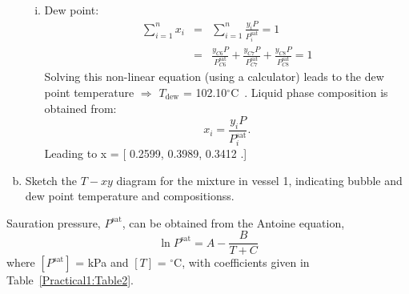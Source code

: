 \documentclass[calculator,allquestions,datasheet,solutions]{exam_newMarcus2}
\newcommand{\frc}{\displaystyle\frac}
\begin{document}
\begin{question}
\begin{enumerate}[a)]
{\begin{enumerate}[i)]
                      \begin{displaymath}
                         y_{i} = \frc{x_{i}P_{i}^{\text{sat}}}{P}.
                      \end{displaymath}
                      Leading to y = [ 0.6603, 0.1870, 0.1527 ]. ~
%
               \item Dew point:
                    \begin{eqnarray}
                        \sum\limits_{i=1}^{n} x_{i} &=& \sum\limits_{i=1}^{n} \frc{y_{i}P}{P_{i}^{\text{sat}}} = 1 \nonumber \\
                                                 &=& \frc{y_{C6}P}{P_{C6}^{\text{sat}}} + \frc{y_{C7}P}{P_{C7}^{\text{sat}}} + \frc{y_{C8}P}{P_{C8}^{\text{sat}}} = 1 \nonumber 
                    \end{eqnarray}
                    Solving this non-linear equation (using a calculator) leads to the dew point temperature $\Longrightarrow$ $T_{\text{dew}}$ = 102.10$^{\circ}$C~.  Liquid phase composition is obtained from:
                      \begin{displaymath}
                         x_{i} = \frc{y_{i}P}{P_{i}^{\text{sat}}}.
                      \end{displaymath}
                      Leading to x = [ 0.2599, 0.3989, 0.3412 .] ~
                          \end{enumerate}
                }
            \item  Sketch the $T-xy$ diagram for the mixture in vessel 1, indicating bubble and dew point temperature and compositionss.~
         \end{enumerate}

         Sauration pressure, $P^{\text{sat}}$, can be obtained from the Antoine equation,
          \begin{displaymath}
            \ln{P^{\text{sat}}} = A - \frc{B}{T+C}
          \end{displaymath}
          where $\left[P^{\text{sat}}\right]$ = kPa and $[T]$ = $^{\circ}$C, with coefficients given in Table~\ref{Practical1:Table2}.
           


\end{question}
\end{document}
